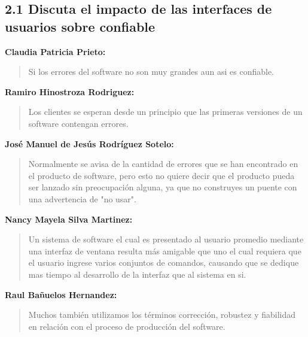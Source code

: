 \subsection*{2.1 Discuta el impacto de las interfaces de usuarios sobre confiable}

\textbf{Claudia Patricia Prieto:}
\begin{quote}
Si los errores del software no son muy grandes aun asi es confiable.
\end{quote}

\textbf{Ramiro Hinostroza Rodriguez:}
\begin{quote}
Los clientes se esperan desde un principio que las primeras versiones de un software contengan errores.
\end{quote}

\textbf{José Manuel de Jesús Rodríguez Sotelo:}
\begin{quote}
Normalmente se avisa de la cantidad de errores que se han encontrado en el producto de software, pero esto no quiere decir que el producto pueda ser lanzado sin preocupación alguna, ya que no construyes un puente con una advertencia de "no usar".
\end{quote}

\textbf{Nancy Mayela Silva Martinez:}
\begin{quote}
Un sistema de software el cual es presentado al usuario promedio mediante una interfaz de ventana resulta más amigable que uno el cual requiera que el usuario ingrese varios conjuntos de comandos, causando que se dedique mas tiempo al desarrollo de la interfaz que al sistema en si.
\end{quote}

\textbf{Raul Bañuelos Hernandez:}
\begin{quote}
Muchos también utilizamos los términos corrección, robustez y fiabilidad en relación con el proceso de producción del software.
\end{quote}